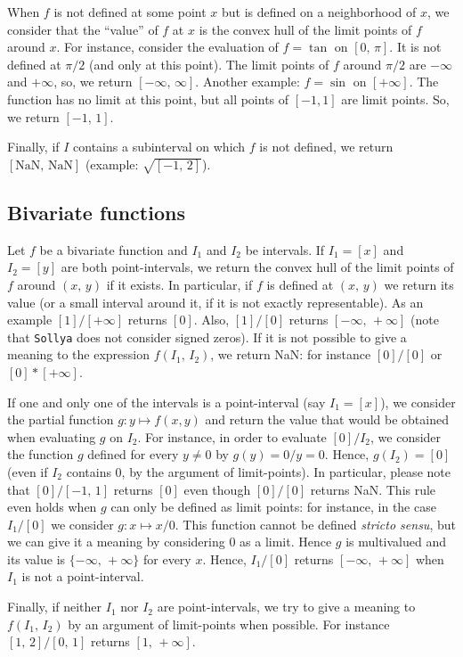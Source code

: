 \documentclass[a4paper]{article}
\newcommand{\sollya}{\texttt{Sollya}\xspace}
\begin{document}
When $f$ is not defined at some point $x$ but is defined on a neighborhood of $x$, we consider that the ``value'' of $f$ at $x$ is the convex hull of the limit points of $f$ around $x$. For instance, consider the evaluation of $f= \tan$ on $[0,\, \pi]$. It is not defined at $\pi/2$ (and only at this point). The limit points of $f$ around $\pi/2$ are $-\infty$ and $+\infty$, so, we return $[-\infty,\,\infty]$. Another example: $f=\sin$ on $[+\infty]$. The function has no limit at this point, but all points of $[-1, 1]$ are limit points. So, we return $[-1,\,1]$.

Finally, if $I$ contains a subinterval on which $f$ is not defined, we return $[\textrm{NaN},\,\textrm{NaN}]$ (example: $\sqrt{[-1,\,2]}$).

\subsection{Bivariate functions}
Let $f$ be a bivariate function and $I_1$ and $I_2$ be intervals. If $I_1=[x]$ and $I_2=[y]$ are both point-intervals, we return the convex hull of the limit points of $f$ around $(x,\,y)$ if it exists. In particular, if $f$ is defined at $(x,\,y)$ we return its value (or a small interval around it, if it is not exactly representable). As an example $[1]/[+\infty]$ returns $[0]$. Also, $[1]/[0]$ returns $[-\infty,\,+\infty]$ (note that \sollya does not consider signed zeros). If it is not possible to give a meaning to the expression $f(I_1,\,I_2)$, we return NaN: for instance $[0]/[0]$ or $[0]*[+\infty]$.

If one and only one of the intervals is a point-interval (say $I_1 = [x]$), we consider the partial function $g: y \mapsto f(x,y)$ and return the value that would be obtained when evaluating $g$ on $I_2$. For instance, in order to evaluate $[0]/I_2$, we consider the function $g$ defined for every $y \neq 0$ by $g(y)=0/y=0$. Hence, $g(I_2) = [0]$ (even if $I_2$ contains $0$, by the argument of limit-points). In particular, please note that $[0]/[-1,\,1]$ returns $[0]$ even though $[0]/[0]$ returns NaN. This rule even holds when $g$ can only be defined as limit points: for instance, in the case $I_1/[0]$ we consider $g: x \mapsto x/0$. This function cannot be defined \emph{stricto sensu}, but we can give it a meaning by considering $0$ as a limit. Hence $g$ is multivalued and its value is $\{-\infty,\,+\infty\}$ for every $x$. Hence, $I_1/[0]$ returns $[-\infty,\,+\infty]$ when $I_1$ is not a point-interval.

Finally, if neither $I_1$ nor $I_2$ are point-intervals, we try to give a meaning to $f(I_1,\,I_2)$ by an argument of limit-points when possible. For instance $[1,\,2] / [0,\,1]$ returns $[1,\,+\infty]$.
\end{document}
